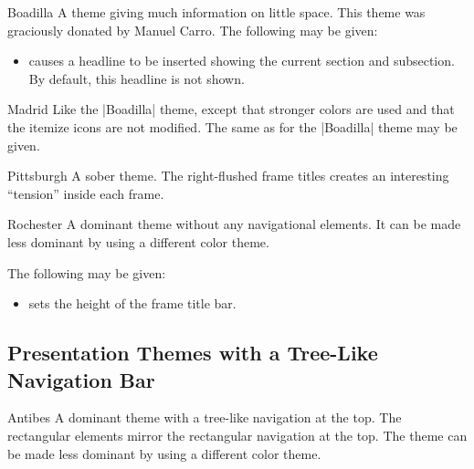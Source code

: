 \begin{themeexample}{Boadilla}
  A theme giving much information on little space. This theme was
  graciously donated by Manuel Carro.
  The following  may be given:
  \begin{itemize}
  \item {} causes a headline to be inserted showing
    the current section and subsection. By default, this
    headline is not shown.
  \end{itemize}
\end{themeexample}

\begin{themeexample}{Madrid}
  Like the |Boadilla| theme, except that stronger colors are used and
  that the itemize icons are not modified. The same  as
  for the |Boadilla| theme may be given.
\end{themeexample}

\begin{themeexample}{Pittsburgh}
  A sober theme. The right-flushed frame titles creates an interesting 
  ``tension'' inside each frame. 
\end{themeexample}


\begin{themeexample}{Rochester}
  A dominant theme without any navigational elements. It can be made less
  dominant by using a different color theme.

  The following  may be given:
  \begin{itemize}
  \item {} sets the height of the
    frame title bar.
  \end{itemize}
\end{themeexample}




\subsection{Presentation Themes with a Tree-Like Navigation Bar}

\begin{themeexample}{Antibes}
  A dominant theme with a tree-like navigation at the top. The 
  rectangular elements mirror the rectangular navigation at the
  top. The theme can be made less dominant by using a different color
  theme. 
\end{themeexample}

